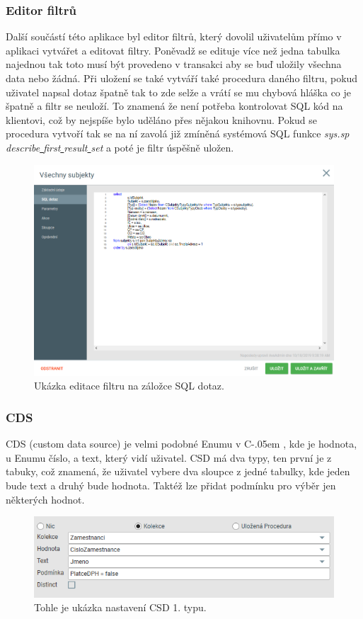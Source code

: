 \documentclass[czech,bachelorpractice,dept460,male,csharp]{diploma}
\newcommand{\Csharp}{%
  {\settoheight{\dimen0}{C}C\kern-.05em \resizebox{!}{\dimen0}{\raisebox{\depth}{\#}}}}
\newcommand{\un}{\underline{ }}
\begin{document}
		\subsubsection{Editor filtrů}
			Další součástí této aplikace byl editor filtrů, který dovolil uživatelům přímo v aplikaci vytvářet a editovat filtry. Poněvadž se edituje více než jedna tabulka najednou tak toto musí být provedeno v transakci aby se buď uložily všechna data nebo žádná. Při uložení se také vytváří také procedura daného filtru, pokud uživatel napsal dotaz špatně tak to zde selže a vrátí se mu chybová hláška co je špatně a filtr se neuloží. To znamená že není potřeba kontrolovat SQL kód na klientovi, což by nejspíše bylo uděláno přes nějakou knihovnu. Pokud se procedura vytvoří tak se na ní zavolá již zmíněná systémová SQL funkce \textit{sys.sp{\un}describe{\un}first{\un}result{\un}set} a poté je filtr úspěšně uložen.
			\begin{figure}[h]
				\includegraphics[width=1.0\textwidth]{Figures/Edit.png}
				\caption{Ukázka editace filtru na záložce SQL dotaz.}
    			\label{fig:Editimg}
			\end{figure}
		\subsubsection{CDS}
			CDS (custom data source) je velmi podobné Enumu v \Csharp, kde je hodnota, u Enumu číslo, a text, který vidí uživatel. CSD má dva typy, ten první je z tabuky, což znamená, že uživatel vybere dva sloupce z jedné tabulky, kde jeden bude text a druhý bude hodnota. Taktéž lze přidat podmínku pro výběr jen některých hodnot.
			\begin{figure}[h]
				\includegraphics{Figures/cds.png}
				\caption{Tohle je ukázka nastavení CSD 1. typu.}
    			\label{fig:CSDimg}
			\end{figure}
			
\end{document}
